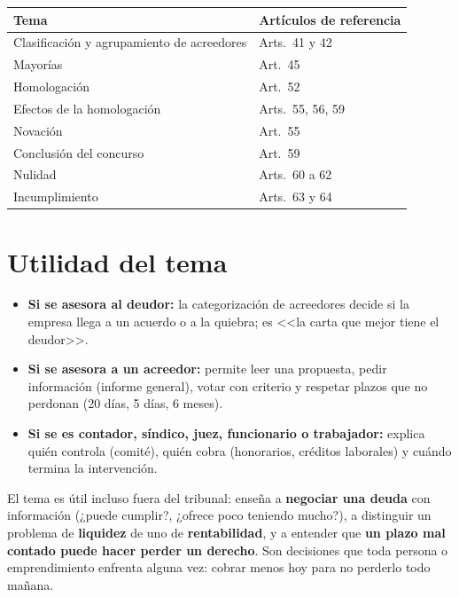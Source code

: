 \documentclass[12pt,oneside]{book}
\begin{document}
\begin{center}
\begin{tabularx}{0.9\textwidth}{Y l}
\toprule
\textbf{Tema} & \textbf{Artículos de referencia} \\
\midrule
Clasificación y agrupamiento de acreedores & Arts.\ 41 y 42 \\
Mayorías & Art.\ 45 \\
Homologación & Art.\ 52 \\
Efectos de la homologación & Arts.\ 55, 56, 59 \\
Novación & Art.\ 55 \\
Conclusión del concurso & Art.\ 59 \\
Nulidad & Arts.\ 60 a 62 \\
Incumplimiento & Arts.\ 63 y 64 \\
\bottomrule
\end{tabularx}
\end{center}

\section{Utilidad del tema}

\begin{itemize}
    \item \textbf{Si se asesora al deudor:} la categorización de acreedores decide si la empresa llega a un acuerdo o a la quiebra; es <<la carta que mejor tiene el deudor>>.
    \item \textbf{Si se asesora a un acreedor:} permite leer una propuesta, pedir información (informe general), votar con criterio y respetar plazos que no perdonan (20 días, 5 días, 6 meses).
    \item \textbf{Si se es contador, síndico, juez, funcionario o trabajador:} explica quién controla (comité), quién cobra (honorarios, créditos laborales) y cuándo termina la intervención.
\end{itemize}

\begin{note}
El tema es útil incluso fuera del tribunal: enseña a \textbf{negociar una deuda} con información (¿puede cumplir?, ¿ofrece poco teniendo mucho?), a distinguir un problema de \textbf{liquidez} de uno de \textbf{rentabilidad}, y a entender que \textbf{un plazo mal contado puede hacer perder un derecho}. Son decisiones que toda persona o emprendimiento enfrenta alguna vez: cobrar menos hoy para no perderlo todo mañana.
\end{note}
\end{document}
